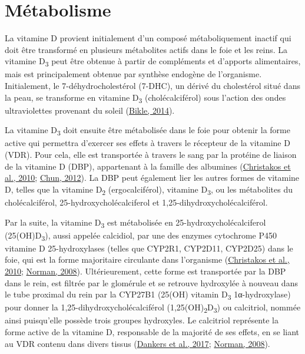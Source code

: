 \documentclass[
  a4paper,
  DIV=11,
  numbers=noendperiod,
  listof=totoc]{scrreprt}
\begin{document}
\hypertarget{muxe9tabolisme}{%
\section{Métabolisme}\label{muxe9tabolisme}}

La vitamine D provient initialement d'un composé métaboliquement inactif
qui doit être transformé en plusieurs métabolites actifs dans le foie et
les reins. La vitamine D\textsubscript{3} peut être obtenue à partir de
compléments et d'apports alimentaires, mais est principalement obtenue
par synthèse endogène de l'organisme. Initialement, le
7-déhydrocholestérol (7-DHC), un dérivé du cholestérol situé dans la
peau, se transforme en vitamine D\textsubscript{3} (cholécalciférol)
sous l'action des ondes ultraviolettes provenant du soleil
(\protect\hyperlink{ref-Bikle.2014aso}{Bikle, 2014}).

La vitamine D\textsubscript{3} doit ensuite être métabolisée dans le
foie pour obtenir la forme active qui permettra d'exercer ses effets à
travers le récepteur de la vitamine D (VDR). Pour cela, elle est
transportée à travers le sang par la protéine de liaison de la vitamine
D (DBP), appartenant à la famille des albumines
(\protect\hyperlink{ref-Christakos.2010}{Christakos et al., 2010};
\protect\hyperlink{ref-Chun.2012}{Chun, 2012}). La DBP peut également
lier les autres formes de vitamine D, telles que la vitamine
D\textsubscript{2} (ergocalciférol), vitamine D\textsubscript{3}, ou les
métabolites du cholécalciférol, 25-hydroxycholécalciferol et
1,25-dihydroxycholécalciférol.

Par la suite, la vitamine D\textsubscript{3} est métabolisée en
25-hydroxycholécalciferol (25(OH)D\textsubscript{3}), aussi appelée
calcidiol, par une des enzymes cytochrome P450 vitamine D
25-hydroxylases (telles que CYP2R1, CYP2D11, CYP2D25) dans le foie, qui
est la forme majoritaire circulante dans l'organisme
(\protect\hyperlink{ref-Christakos.2010}{Christakos et al., 2010};
\protect\hyperlink{ref-Norman.2008}{Norman, 2008}). Ultérieurement,
cette forme est transportée par la DBP dans le rein, est filtrée par le
glomérule et se retrouve hydroxylée à nouveau dans le tube proximal du
rein par la CYP27B1 (25(OH) vitamin D\textsubscript{3} 1α-hydroxylase)
pour donner la 1,25-dihydroxycholécalciférol
(1,25(OH)\textsubscript{2}D\textsubscript{3}) ou calcitriol, nommée
ainsi puisqu'elle possède trois groupes hydroxyles. Le calcitriol
représente la forme active de la vitamine D, responsable de la majorité
de ses effets, en se liant au VDR contenu dans divers tissus
(\protect\hyperlink{ref-Dankers.2017}{Dankers et al., 2017};
\protect\hyperlink{ref-Norman.2008}{Norman, 2008}).
\end{document}
